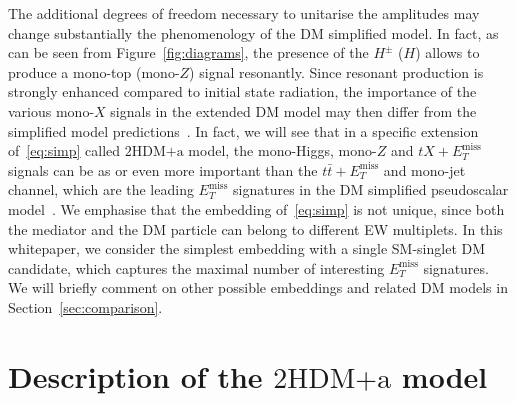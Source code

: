 \documentclass[a4paper, 11pt,notoc]{article}
\newcommand{\MET}{\ensuremath{E_T^\mathrm{miss}}\xspace}
\newcommand{\hdma}{\ensuremath{\textrm{2HDM+a}}\xspace}
\begin{document}
The additional degrees of freedom necessary to unitarise the amplitudes may change substantially the phenomenology of the DM simplified model. In fact, as can be seen from Figure~\ref{fig:diagrams}, the presence of the $H^\pm$ ($H$) allows to produce a mono-top (mono-$Z$)  signal resonantly. Since resonant production is strongly enhanced compared to initial state radiation, the  importance of the various mono-$X$ signals in the extended DM model may then differ from the simplified model predictions~\cite{Goncalves:2016iyg,Bauer:2017ota,Pani:2017qyd}. In fact, we will see that in a specific extension of~\eqref{eq:simp}  called \hdma model, the mono-Higgs, mono-$Z$ and $t X + \MET$ signals can be as or even more important than the $t \bar t + \MET$ and mono-jet channel, which are  the leading $\MET$ signatures in the DM simplified pseudoscalar model~\cite{Haisch:2012kf,Fox:2012ru,Buckley:2014fba,Harris:2014hga,Haisch:2015ioa,Mattelaer:2015haa,Backovic:2015soa,Neubert:2015fka,Arina:2016cqj}. We emphasise that the embedding of~\eqref{eq:simp} is not unique, since  both the mediator and the DM particle can belong to different EW multiplets. In this whitepaper, we consider the simplest embedding with a single SM-singlet DM candidate, which captures the maximal number of interesting $\MET$ signatures. We will briefly comment on other possible embeddings and related DM models in Section~\ref{sec:comparison}.  


\section{Description of the \hdma model}
\label{sec:modeldescription}
\end{document}
